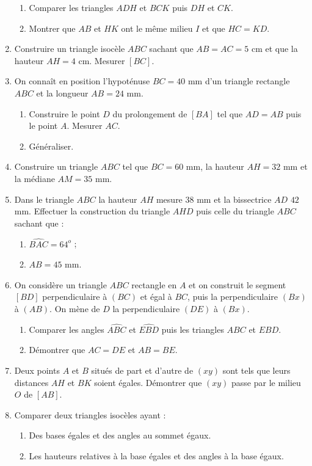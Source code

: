 \documentclass[12 pt]{report}
\theoremstyle{plain}
\newcounter{n}
\begin{document}
\begin{enumerate}
\begin{enumerate}
\item Comparer les triangles $ADH$ et $BCK$ puis $DH$ et $CK$. 
\item Montrer que $AB$ et $HK$ ont le même milieu $I$ et que $HC=KD$.
\end{enumerate}
\item Construire un triangle isocèle $ABC$ sachant que $AB=AC=5$ cm et que la hauteur $AH=4$ cm. Mesurer $[BC]$.
\item On connaît en position l'hypoténuse $BC = 40$ mm d'un triangle rectangle $ABC$ et la longueur $AB=24$ mm. \begin{enumerate}
\item Construire le point $D$ du prolongement de $[BA]$ tel que $AD=AB$ puis le point 
$A$. Mesurer $AC$. 
\item Généraliser.
\end{enumerate}
\item Construire un triangle $ABC$ tel que $BC=60$ mm, la hauteur $AH=32$ mm et la médiane $AM=35$ mm. 
\item Dans le triangle $ABC$ la hauteur $AH$ mesure $38$ mm et la bissectrice $AD$ $42$ mm. Effectuer la construction du triangle $AHD$ puis celle du triangle $ABC$ sachant que :\begin{enumerate}
\item $\widehat{BAC}=64^o$ ; 
\item $AB=45$ mm.
\end{enumerate}
\item On considère un triangle $ABC$ rectangle en $A$ et on construit le segment $[BD]$ perpendiculaire à $(BC)$ et égal à $BC$, puis la perpendiculaire $(Bx)$ à
$(AB)$. On mène de $D$ la perpendiculaire $(DE)$ à $(Bx)$.\begin{enumerate}
\item Comparer les angles $\widehat{ABC}$ et $\widehat{EBD}$ puis les triangles
$ABC$ et $EBD$.
\item Démontrer que $AC=DE$ et $AB=BE$.
\end{enumerate}
\item Deux points $A$ et $B$ situés de part et d'autre de $(xy)$ sont tels que leurs distances $AH$ et $BK$ soient égales. Démontrer que $(xy)$ passe par le milieu $O$ 
de $[AB]$.
\item Comparer deux triangles isocèles ayant : \begin{enumerate}
\item Des bases égales et des angles au sommet égaux.
\item Les hauteurs relatives à la base égales et des angles à la base égaux.

\end{enumerate}
\end{enumerate}
\end{document}
